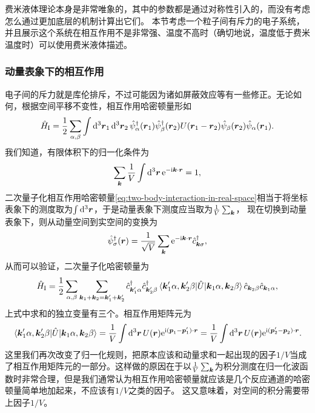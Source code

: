 \documentclass[hyperref, UTF8, a4paper]{ctexart}
\newcommand*{\ii}{\mathrm{i}}
\newcommand*{\ee}{\mathrm{e}}
\begin{document}
费米液体理论本身是非常唯象的，其中的参数都是通过对称性引入的，而没有考虑怎么通过更加底层的机制计算出它们。
本节考虑一个粒子间有斥力的电子系统，并且展示这个系统在相互作用不是非常强、温度不高时（确切地说，温度低于费米温度时）可以使用费米液体描述。

\subsubsection{动量表象下的相互作用}

电子间的斥力就是库伦排斥，不过可能因为诸如屏蔽效应等有一些修正。无论如何，根据空间平移不变性，相互作用哈密顿量形如
\begin{equation}
    \hat{H}_\text{I} = \frac{1}{2} \sum_{\alpha, \beta} \int \dd[3]{\vb*{r}_1} \dd[3]{\vb*{r}_2} \hat{\psi}^\dagger_\alpha(\vb*{r}_1) \hat{\psi}^\dagger_\beta(\vb*{r}_2) U(\vb*{r}_1 - \vb*{r}_2) \hat{\psi}_\beta(\vb*{r}_2) \hat{\psi}_\alpha(\vb*{r}_1).
    \label{eq:two-body-interaction-in-real-space}
\end{equation}
我们知道，有限体积下的归一化条件为
\[
    \sum_{\vb*{k}} \frac{1}{V} \int \dd[3]{\vb*{r}} \ee^{-\ii \vb*{k} \cdot \vb*{r}} = 1,
\]
二次量子化相互作用哈密顿量\eqref{eq:two-body-interaction-in-real-space}相当于将坐标表象下的测度取为$\int \dd[3]{\vb*{r}}$，于是动量表象下测度应当取为$\frac{1}{V} \sum_{\vb*{k}}$，
现在切换到动量表象下，则从动量空间到实空间的变换为
\[
    \hat{\psi}_\sigma^\dagger(\vb*{r}) = \frac{1}{\sqrt{V}} \sum_{\vb*{k}} \ee^{- \ii \vb*{k} \cdot \vb*{r}} \hat{c}^\dagger_{\vb*{k} \sigma},
\]
从而可以验证，二次量子化哈密顿量为
\[
    \hat{H}_\text{I} = \frac{1}{2} \sum_{\alpha, \beta} \sum_{\vb*{k}_1 + \vb*{k}_2 = \vb*{k}_1' + \vb*{k}_2'} \hat{c}^\dagger_{\vb*{k}'_1 \alpha} \hat{c}^\dagger_{\vb*{k}'_2 \beta} \mel*{\vb*{k}_1' \alpha, \vb*{k}_2' \beta}{\hat{U}}{\vb*{k}_1 \alpha, \vb*{k}_2 \beta} \hat{c}_{\vb*{k}_2 \beta} \hat{c}_{\vb*{k}_1 \alpha},
\]
上式中求和的独立变量有三个。相互作用矩阵元为
\begin{equation}
    \mel*{\vb*{k}_1' \alpha, \vb*{k}_2' \beta}{\hat{U}}{\vb*{k}_1 \alpha, \vb*{k}_2 \beta} = \frac{1}{V} \int \dd[3]{\vb*{r}} U(\vb*{r}) \ee^{\ii (\vb*{p}_1 - \vb*{p}'_1) \cdot \vb*{r}} = \frac{1}{V} \int \dd[3]{\vb*{r}} U(\vb*{r}) \ee^{\ii (\vb*{p}_2' - \vb*{p}_2) \cdot \vb*{r}}.
\end{equation}
这里我们再次改变了归一化规则，把原本应该和动量求和一起出现的因子$1/V$当成了相互作用矩阵元的一部分。这样做的原因在于以$\frac{1}{V} \sum_{\vb*{k}}$为积分测度在归一化波函数时非常合理，但是我们通常认为相互作用哈密顿量就应该是几个反应通道的哈密顿量简单地加起来，不应该有$1/V$之类的因子。
这又意味着，对空间的积分需要带上因子$1/V$。
\end{document}
